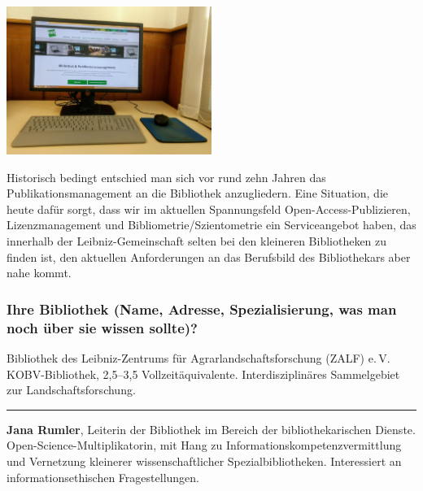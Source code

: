 \begin{center}
\includegraphics[width=0.5\textwidth]{zalf/img/publikationsmanagement.jpg}
\end{center}

Historisch bedingt entschied man sich vor rund zehn Jahren das
Publikationsmanagement an die Bibliothek anzugliedern. Eine Situation,
die heute dafür sorgt, dass wir im aktuellen Spannungsfeld
Open-Access-Publizieren, Lizenzmanagement und Bibliometrie/Szientometrie
ein Serviceangebot haben, das innerhalb der Leibniz-Gemeinschaft selten
bei den kleineren Bibliotheken zu finden ist, den aktuellen
Anforderungen an das Berufsbild des Bibliothekars aber nahe kommt.

\hypertarget{ihre-bibliothek-name-adresse-spezialisierung-was-man-noch-uxfcber-sie-wissen-sollte}{%
\subsubsection*{Ihre Bibliothek (Name, Adresse, Spezialisierung, was man noch
über sie wissen
sollte)?}\label{ihre-bibliothek-name-adresse-spezialisierung-was-man-noch-uxfcber-sie-wissen-sollte}}

Bibliothek des Leibniz-Zentrums für Agrarlandschaftsforschung (ZALF)
e.\,V. KOBV-Bibliothek, 2,5--3,5 Vollzeitäquivalente. Interdisziplinäres
Sammelgebiet zur Landschaftsforschung.

\begin{center}\rule{0.5\linewidth}{\linethickness}\end{center}

\textbf{Jana Rumler}, Leiterin der Bibliothek im Bereich der
bibliothekarischen Dienste. Open-Science-Multiplikatorin, mit Hang zu
Informationskompetenzvermittlung und Vernetzung kleinerer
wissenschaftlicher Spezialbibliotheken. Interessiert an
informationsethischen Fragestellungen.

